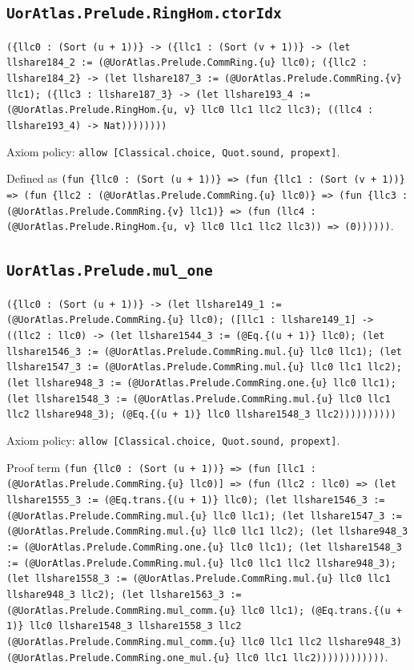 \documentclass[11pt]{article}
\begin{document}
\subsection*{\texttt{UorAtlas.Prelude.RingHom.ctorIdx}}
\noindent\texttt{(\{llc0 : (Sort (u + 1))\} -> (\{llc1 : (Sort (v + 1))\} -> (let llshare184\_2 := (@UorAtlas.Prelude.CommRing.\{u\} llc0); (\{llc2 : llshare184\_2\} -> (let llshare187\_3 := (@UorAtlas.Prelude.CommRing.\{v\} llc1); (\{llc3 : llshare187\_3\} -> (let llshare193\_4 := (@UorAtlas.Prelude.RingHom.\{u, v\} llc0 llc1 llc2 llc3); ((llc4 : llshare193\_4) -> Nat))))))))}\par
\noindent Axiom policy: \texttt{allow [Classical.choice, Quot.sound, propext]}.\par
\noindent Defined as \texttt{(fun \{llc0 : (Sort (u + 1))\} => (fun \{llc1 : (Sort (v + 1))\} => (fun \{llc2 : (@UorAtlas.Prelude.CommRing.\{u\} llc0)\} => (fun \{llc3 : (@UorAtlas.Prelude.CommRing.\{v\} llc1)\} => (fun (llc4 : (@UorAtlas.Prelude.RingHom.\{u, v\} llc0 llc1 llc2 llc3)) => (0))))))}.\par
\subsection*{\texttt{UorAtlas.Prelude.mul\_one}}
\noindent\texttt{(\{llc0 : (Sort (u + 1))\} -> (let llshare149\_1 := (@UorAtlas.Prelude.CommRing.\{u\} llc0); ([llc1 : llshare149\_1] -> ((llc2 : llc0) -> (let llshare1544\_3 := (@Eq.\{(u + 1)\} llc0); (let llshare1546\_3 := (@UorAtlas.Prelude.CommRing.mul.\{u\} llc0 llc1); (let llshare1547\_3 := (@UorAtlas.Prelude.CommRing.mul.\{u\} llc0 llc1 llc2); (let llshare948\_3 := (@UorAtlas.Prelude.CommRing.one.\{u\} llc0 llc1); (let llshare1548\_3 := (@UorAtlas.Prelude.CommRing.mul.\{u\} llc0 llc1 llc2 llshare948\_3); (@Eq.\{(u + 1)\} llc0 llshare1548\_3 llc2))))))))))}\par
\noindent Axiom policy: \texttt{allow [Classical.choice, Quot.sound, propext]}.\par
\noindent Proof term \texttt{(fun \{llc0 : (Sort (u + 1))\} => (fun [llc1 : (@UorAtlas.Prelude.CommRing.\{u\} llc0)] => (fun (llc2 : llc0) => (let llshare1555\_3 := (@Eq.trans.\{(u + 1)\} llc0); (let llshare1546\_3 := (@UorAtlas.Prelude.CommRing.mul.\{u\} llc0 llc1); (let llshare1547\_3 := (@UorAtlas.Prelude.CommRing.mul.\{u\} llc0 llc1 llc2); (let llshare948\_3 := (@UorAtlas.Prelude.CommRing.one.\{u\} llc0 llc1); (let llshare1548\_3 := (@UorAtlas.Prelude.CommRing.mul.\{u\} llc0 llc1 llc2 llshare948\_3); (let llshare1558\_3 := (@UorAtlas.Prelude.CommRing.mul.\{u\} llc0 llc1 llshare948\_3 llc2); (let llshare1563\_3 := (@UorAtlas.Prelude.CommRing.mul\_comm.\{u\} llc0 llc1); (@Eq.trans.\{(u + 1)\} llc0 llshare1548\_3 llshare1558\_3 llc2 (@UorAtlas.Prelude.CommRing.mul\_comm.\{u\} llc0 llc1 llc2 llshare948\_3) (@UorAtlas.Prelude.CommRing.one\_mul.\{u\} llc0 llc1 llc2))))))))))))}.\par
\end{document}
